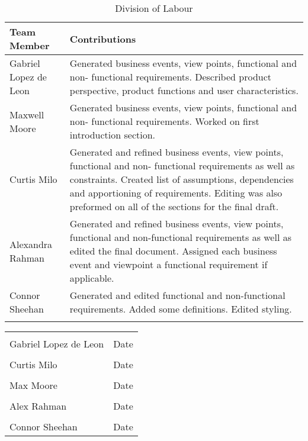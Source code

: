\documentclass[titlepage]{article}
\newcounter{req}
\begin{document}
		\begin{longtable}{| p{} | p{} |}
			\hline
			\textbf {Team Member} & \textbf{Contributions}\\ 
			\hline
			Gabriel Lopez de Leon &  Generated business events, view points, functional and non- functional requirements. Described product perspective, product functions and user characteristics.\\
			\hline
			Maxwell Moore & Generated business events, view points, functional and non- functional requirements. Worked on first introduction section.\\
			\hline
			Curtis Milo & Generated and refined business events, view points, functional and non- functional requirements as well as constraints. Created list of assumptions, dependencies and apportioning of requirements. Editing was also preformed on all of the sections for the final draft. \\ 
			\hline
			Alexandra Rahman & Generated and refined business events, view points, functional and non-functional requirements as well as edited the final document. Assigned each business event and viewpoint a functional requirement if applicable.\\
			\hline
			Connor Sheehan & Generated and edited functional and non-functional requirements. Added some definitions. Edited styling.\\
			\hline
			
			\caption{Division of Labour}
		\end{longtable}
		
	\noindent\begin{tabular}{ll}\\
	\makebox[2.5in]{\hrulefill} & \makebox[2.5in]			{\hrulefill}\\
	Gabriel Lopez de Leon & Date\\[8ex]%
	\makebox[2.5in]{\hrulefill} & \makebox[2.5in]			{\hrulefill}\\
	Curtis Milo & Date\\[8ex]
	\makebox[2.5in]{\hrulefill} & \makebox[2.5in]			{\hrulefill}\\
	Max Moore & Date\\[8ex]
	\makebox[2.5in]{\hrulefill} & \makebox[2.5in]			{\hrulefill}\\
	Alex Rahman & Date\\[8ex]
	\makebox[2.5in]{\hrulefill} & \makebox[2.5in]			{\hrulefill}\\
	Connor Sheehan & Date\\
	\end{tabular}
		
\end{document}
